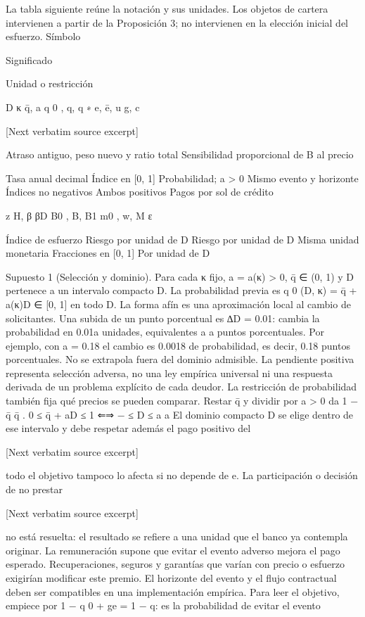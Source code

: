 \documentclass[10pt]{article}
\begin{document}
\begin{ReviewVerbatim}

La tabla siguiente reúne la notación y sus unidades. Los objetos de cartera intervienen a partir
de la Proposición 3; no intervienen en la elección inicial del esfuerzo.
Símbolo

Signiﬁcado

Unidad o restricción

D
κ
q̄, a
q 0 , q, q ∗
e, ē, u
g, c

[Next verbatim source excerpt]

Atraso antiguo, peso nuevo y ratio total
Sensibilidad proporcional de B al precio

Tasa anual decimal
Índice en [0, 1]
Probabilidad; a > 0
Mismo evento y horizonte
Índices no negativos
Ambos positivos
Pagos por sol de crédito

z
H, β
βD
B0 , B, B1
m0 , w, M
ε

Índice de esfuerzo
Riesgo por unidad de D
Riesgo por unidad de D
Misma unidad monetaria
Fracciones en [0, 1]
Por unidad de D

Supuesto 1 (Selección y dominio). Para cada κ ﬁjo, a = a(κ) > 0, q̄ ∈ (0, 1) y D pertenece a un
intervalo compacto D. La probabilidad previa es q 0 (D, κ) = q̄ + a(κ)D ∈ [0, 1] en todo D.
La forma afín es una aproximación local al cambio de solicitantes. Una subida de un punto
porcentual es ∆D = 0.01: cambia la probabilidad en 0.01a unidades, equivalentes a a puntos porcentuales. Por ejemplo, con a = 0.18 el cambio es 0.0018 de probabilidad, es decir, 0.18 puntos
porcentuales. No se extrapola fuera del dominio admisible. La pendiente positiva representa selección adversa, no una ley empírica universal ni una respuesta derivada de un problema explícito de
cada deudor.
La restricción de probabilidad también ﬁja qué precios se pueden comparar. Restar q̄ y dividir
por a > 0 da
1 − q̄
q̄
.
0 ≤ q̄ + aD ≤ 1 ⇐⇒ − ≤ D ≤
a
a
El dominio compacto D se elige dentro de ese intervalo y debe respetar además el pago positivo del

[Next verbatim source excerpt]

todo el objetivo tampoco lo afecta si no depende de e. La participación o decisión de no prestar

[Next verbatim source excerpt]

no está resuelta: el resultado se reﬁere a una unidad que el banco ya contempla originar. La remuneración supone que evitar el evento adverso mejora el pago esperado. Recuperaciones, seguros y
garantías que varían con precio o esfuerzo exigirían modiﬁcar este premio. El horizonte del evento
y el ﬂujo contractual deben ser compatibles en una implementación empírica.
Para leer el objetivo, empiece por 1 − q 0 + ge = 1 − q: es la probabilidad de evitar el evento


\end{ReviewVerbatim}
\end{document}

